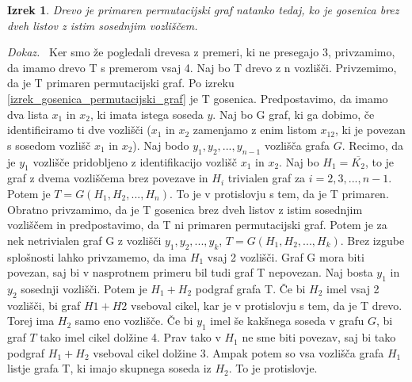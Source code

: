 \documentclass[a4paper, 12pt]{book}
\newtheorem{izrek}{Izrek}[chapter]
\newenvironment{dokaz}{\emph{Dokaz.}\ }{\hspace{\fill}{$\Box$}}
\begin{document}
\begin{izrek}
    Drevo je primaren permutacijski graf natanko tedaj, ko je gosenica brez dveh listov z istim sosednjim vozliščem.
\end{izrek}
\begin{dokaz}
    Ker smo že pogledali drevesa z premeri, ki ne presegajo 3, privzamimo, da imamo drevo T s premerom vsaj 4. Naj bo T drevo z n vozlišči. Privzemimo, da je T primaren permutacijski graf. Po izreku \ref{izrek_gosenica_permutacijski_graf} je T gosenica. Predpostavimo, da imamo dva lista $x_1$ in $x_2$, ki imata istega soseda $y$. Naj bo G graf, ki ga dobimo, če identificiramo ti dve vozlišči ($x_1$ in $x_2$ zamenjamo z enim listom $x_12$, ki je povezan s sosedom vozlišč $x_1$ in $x_2$). Naj bodo $y_1, y_2, ..., y_{n-1}$ vozlišča grafa $G$. Recimo, da je $y_1$ vozlišče pridobljeno z identifikacijo vozlišč $x_1$ in $x_2$. Naj bo $H_1 = \overline{K_2}$, to je graf z dvema vozliščema brez povezave in $H_i$ trivialen graf za $i = 2, 3, ..., n-1$. Potem je $T = G(H_1, H_2, ..., H_n)$. To je v protislovju s tem, da je T primaren. Obratno privzamimo, da je T gosenica brez dveh listov z istim sosednjim vozliščem in predpostavimo, da T ni primaren permutacijski graf. Potem je za nek netrivialen graf G z vozlišči $y_1, y_2, ..., y_k$, $T = G(H_1, H_2, ..., H_k)$. Brez izgube splošnosti lahko privzamemo, da ima $H_1$ vsaj 2 vozlišči. Graf G mora biti povezan, saj bi v nasprotnem primeru bil tudi graf T nepovezan. Naj bosta $y_1$ in $y_2$ sosednji vozlišči. Potem je $H_1 + H_2$ podgraf grafa T. Če bi $H_2$ imel vsaj 2 vozlišči, bi graf $H1 + H2$ vseboval cikel, kar je v protislovju s tem, da je T drevo. Torej ima $H_2$ samo eno vozlišče. Če bi $y_1$ imel še kakšnega soseda v grafu $G$, bi graf $T$ tako imel cikel dolžine 4. Prav tako v $H_1$ ne sme biti povezav, saj bi tako podgraf $H_1 + H_2$ vseboval cikel dolžine 3. Ampak potem so vsa vozlišča grafa $H_1$ listje grafa T, ki imajo skupnega soseda iz $H_2$. To je protislovje.
\end{dokaz}
\end{document}

